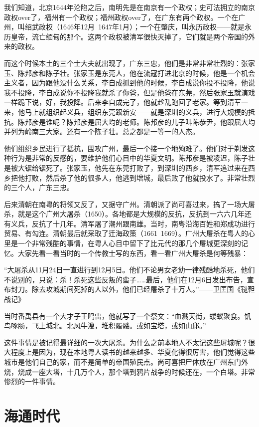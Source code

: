我们知道，北京1644年沦陷之后，南明先是在南京有一个政权；史可法拥立的南京政权over了，福州有一个政权；福州政权over了，在广东有两个政权。一个在广州，叫绍武政权（1646年12月~1647年1月）；一个在肇庆，叫永历政权——就是永历皇帝，流亡缅甸的那个。这两个政权被清军很快灭掉了，它们就是两个帝国的外来的政权。

而这个时候本土的三个士大夫就出现了，广东三忠，他们是非常非常壮烈的：张家玉、陈邦彦和陈子壮。张家玉是东莞人，他在流寇打进北京的时候，他是一个机会主义者，因为跟他没什么关系，李自成抓到他的时候，李自成说你投不投降，他说我不投降，李自成说你不投降我就杀了你爸，但是他爸在东莞，然后张家玉就演戏一样跪下说，好，我投降。后来李自成完了，他就趁乱跑回了老家。等到清军一来，他马上就组织起义兵，组织东莞跟新安——就是深圳的义兵，进行大规模的抵抗。陈邦彦是谁呢？陈邦彦是屈大均的老师。陈邦彦的儿子叫陈恭尹，他跟屈大均并列为岭南三大家。还有一个陈子壮。总之都是一等一的人杰。

他们组织乡民进行了抵抗，围攻广州，最后一个接一个地殉难了。他们对于剃发这种行为是非常的反感的，要维护他们心目中的华夏文明。陈邦彦是被凌迟，陈子壮是被大锯给锯死了。张家玉，他先在东莞打败了，到深圳的西乡，清军追过来在西乡把他打败，然后杀了他的很多人，他逃到增城，最后败了他就投水了。非常壮烈的三个人，广东三忠。

后来清朝在南粤的将领又反了，又据守广州。清朝派了尚可喜过来，搞了一场大屠杀，就是这个广州大屠杀（1650）。各地都是大规模的反抗，反抗到一六六几年还有义兵，反抗了十几年。清军屠了潮州跟南雄。当时，南粤沿海百姓和郑成功进行贸易、有勾连。清朝最后就采取了迁海政策（1661~1669）。广州大屠杀在粤人的心里是一个非常残酷的事情，在粤人心目中留下了比元代的那几个屠城更深刻的记忆。大家先看一看当时的一个传教士写的东西，看一看广州大屠杀是何等残暴：

“大屠杀从11月24日一直进行到12月5日。他们不论男女老幼一律残酷地杀死，他们不说别的，只说：杀！杀死这些反叛的蛮子……最后，他们在12月6日发出布告，宣布封刀。除去攻城期间死掉的人以外，他们已经屠杀了十万人。”——卫匡国《鞑靼战记》

当时番禹县有一个大才子王鸣雷，他就写了一个祭文：“血溅天街，蝼蚁聚食。饥鸟啄肠，飞上城北。北风牛溲，堆积髑髅。或如宝塔，或如山邱。”

这件事情是被记得最详细的一次大屠杀。为什么之前本地人不太记这些屠城呢？很大程度上是因为，现在本地粤人读书的越来越多、华夏化得很厉害，他们觉得这些城市是他们自己的家，而不是简单的帝国殖民点。尚可喜把尸体放在广州东门外烧，烧成一座大塔，十几万个人，那个塔到鸦片战争的时候还在，一个白塔。非常惨烈的一件事情。

\section{海通时代}

